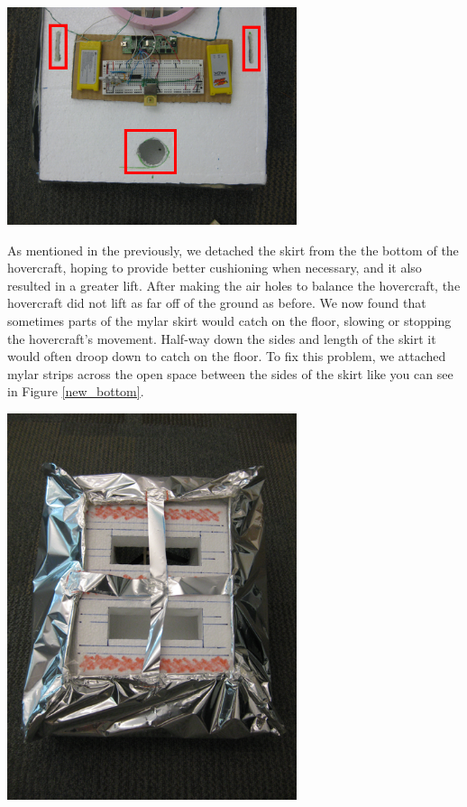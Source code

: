\begin{center}
  \includegraphics[width=85mm]{imageSources/designProblemsnew_holeshighlighted.png}
\end{center}
\label{new_holes}

As mentioned in the previously, we detached the skirt from the the bottom of the hovercraft, hoping to provide
better cushioning when necessary, and it also resulted in a greater lift. After making the air holes to balance
the hovercraft, the hovercraft did not lift as far off of the ground as before. We now found that sometimes parts
of the mylar skirt would catch on the floor, slowing or stopping the hovercraft's movement. Half-way down the
sides and length of the skirt it would often droop down to catch on the floor. To fix this problem, we attached
mylar strips across the open space between the sides of the skirt like you can see in Figure \ref{new_bottom}.

\begin{center}
  \includegraphics[width=85mm]{imageSources/designProblemsnew_bottom.png}
\end{center}
\label{new_bottom}

